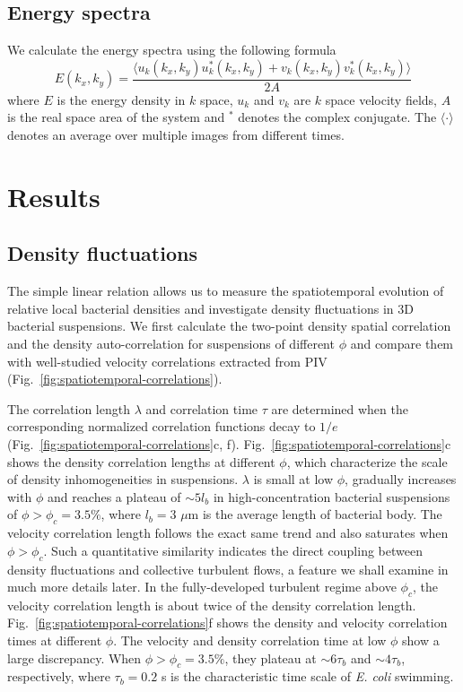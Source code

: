 \subsection{Energy spectra}

We calculate the energy spectra using the following formula
\begin{equation}
E(k_x, k_y) = \frac{\langle u_k(k_x, k_y)u^*_k(k_x, k_y)+v_k(k_x, k_y)v_k^*(k_x, k_y)\rangle}{2A}
\end{equation}
where $E$ is the energy density in $k$ space, $u_k$ and $v_k$ are $k$ space velocity fields, $A$ is the real space area of the system and $^*$ denotes the complex conjugate. The $\langle\cdot\rangle$ denotes an average over multiple images from different times.

\section{Results}
\subsection{Density fluctuations}

The simple linear relation allows us to measure the spatiotemporal evolution of relative local bacterial densities and investigate density fluctuations in 3D bacterial suspensions. We first calculate the two-point density spatial correlation and the density auto-correlation for suspensions of different $\phi$ and compare them with well-studied velocity correlations extracted from PIV (Fig.~\ref{fig:spatiotemporal-correlations}).

The correlation length $\lambda$ and correlation time $\tau$ are determined when the corresponding normalized correlation functions decay to $1/e$ (Fig.~\ref{fig:spatiotemporal-correlations}c, f). Fig.~\ref{fig:spatiotemporal-correlations}c shows the density correlation lengths at different $\phi$, which characterize the scale of density inhomogeneities in suspensions.
$\lambda$ is small at low $\phi$, gradually increases with $\phi$ and reaches a plateau of $\sim 5l_b$ in high-concentration bacterial suspensions of $\phi > \phi_c = 3.5\%$, where $l_b=3$ $\mu$m is the average length of bacterial body. The velocity correlation length follows the exact same trend and also saturates when $\phi > \phi_c$. Such a quantitative similarity indicates the direct coupling between density fluctuations and collective turbulent flows, a feature we shall examine in much more details later. In the fully-developed turbulent regime above $\phi_c$, the velocity correlation length is about twice of the density correlation length.
Fig.~\ref{fig:spatiotemporal-correlations}f shows the density and velocity correlation times at different $\phi$. The velocity and density correlation time at low $\phi$ show a large discrepancy. When $\phi > \phi_c=3.5\%$, they plateau at $\sim 6\tau_b$ and $\sim 4\tau_b$, respectively, where $\tau_b=0.2$ s is the characteristic time scale of \textit{E. coli} swimming.


